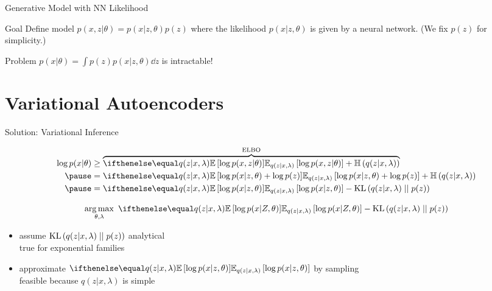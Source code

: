 \documentclass[14pt]{beamer}
\begin{document}
\begin{frame}{Generative Model with NN Likelihood}
\begin{block}{Goal}
Define model $ p(x,z|\theta) = p(x|z,\theta)p(z) $ where the likelihood $ p(x|z,\theta) $ is given by a neural
network. (We fix $ p(z) $ for simplicity.)
\end{block}

\begin{block}{Problem}
$ p(x|\theta) = \int p(z) p(x|z,\theta)  \dd z $ is intractable!
\end{block}
\end{frame}



\section{Variational Autoencoders}
\frame{\tableofcontents[currentsection]}

\begin{frame}{Solution: Variational Inference}

\vspace{-10pt}
\begin{small}
\begin{equation*}
\begin{aligned}
\log p(x|\theta) &\geq \overbrace{\E[q(z|x, \lambda)]{\log p(x,z|\theta)} + \Ent{q(z|x, \lambda)}}^{\ELBO} \\ 
\pause
&= \E[q(z|x, \lambda)]{\log p(x|z, \theta) + \log p(z)} + \Ent{q(z|x, \lambda)} \\ \pause
&= \E[q(z|x, \lambda)]{\log p(x|z, \theta)} - \KL{q(z|x, \lambda)}{p(z)}
\end{aligned}
\end{equation*}
\end{small}

\pause

\vspace{-20pt}
\begin{equation*}
\argmax_{\theta,\lambda} ~ \E[q(z|x, \lambda)]{\log p(x|Z, \theta)} - \KL{q(z|x, \lambda)}{p(z)}
\end{equation*}


\pause

\begin{itemize}
	\item assume $\operatorname{KL}\left(q(z|x, \lambda)\mid\mid p(z)\right)$  analytical\\
	true for exponential families \pause
	\item approximate $\E[q(z|x, \lambda)]{\log p(x|z, \theta)}$ by sampling\\
	feasible because  $q(z|x, \lambda)$ is simple
\end{itemize}


\end{frame}
\end{document}

